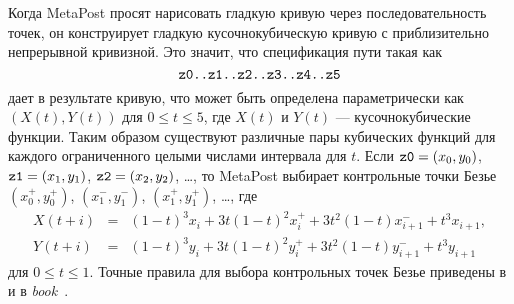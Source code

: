 \documentclass{article} %
\begin{document}
Когда MetaPost просят нарисовать гладкую кривую через последовательность 
точек, он конструирует гладкую кусочнокубическую кривую 
с приблизительно непрерывной кривизной.
Это значит, что спецификация пути такая как
$$ \hbox{\verb|z0..z1..z2..z3..z4..z5|} $$
дает в результате кривую, что может быть определена 
параметрически как $(X(t),Y(t))$ для 
$0\leqslant t\leqslant5$, где $X(t)$ и $Y(t)$ --- кусочнокубические функции. 
Таким образом существуют различные пары кубических функций для каждого ограниченного 
целыми числами интервала для $t$.
Если ${\tt z0}=(x_0,y_0)$, ${\tt z1}=(x_1,y_1)$,
${\tt z2}=(x_2,y_2)$, \ldots, то MetaPost выбирает 
контрольные точки Безье
$(x_0^+,y_0^+)$, $(x_1^-,y_1^-)$, $(x_1^+,y_1^+)$, \ldots, 
где
\begin{eqnarray*}
  X(t+i) &=& (1-t)^3x_i + 3t(1-t)^2x_i^+ + 3t^2(1-t)x_{i+1}^- + t^3x_{i+1},\\
  Y(t+i) &=& (1-t)^3y_i + 3t(1-t)^2y_i^+ + 3t^2(1-t)y_{i+1}^- + t^3y_{i+1}
\end{eqnarray*}
для 
$0\le t\le1$. 
Точные правила для выбора контрольных точек Безье приведены в \cite{ho:splin} 
и в {\sl \MF book\/}~\cite{kn:c}.
\end{document}
